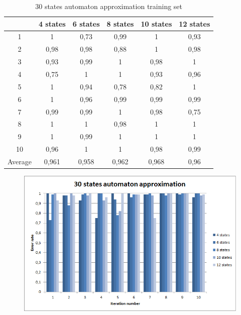 \documentclass[runningheads,a4paper]{llncs}
\begin{document}
\begin{table}[]
\centering
\caption{30 states automaton approximation training set}
\label{my-label}
\begin{tabular}{@{}cccccc@{}}
\toprule
        & 4 states & 6 states & 8 states & 10 states & 12 states    \\ \midrule
1       & 1        & 0,73     & 0,99     & 1         & 0,93 \\
2       & 0,98     & 0,98     & 0,88     & 1         & 0,98 \\
3       & 0,93     & 0,99     & 1        & 0,98      & 1 \\
4       & 0,75     & 1        & 1        & 0,93      & 0,96   \\
5       & 1        & 0,94     & 0,78     & 0,82      & 1   \\
6       & 1        & 0,96     & 0,99     & 0,99      & 0,99    \\
7       & 0,99     & 0,99     & 1        & 0,98      & 0,75    \\
8       & 1        & 1        & 0,98     & 1         & 1    \\
9       & 1        & 0,99     & 1        & 1         & 1 \\
10      & 0,96     & 1        & 1        & 0,98      & 0,99  \\
Average & 0,961    & 0,958    & 0,962    & 0,968     & 0,96  \\ \bottomrule
\end{tabular}
\end{table}

\begin{figure}
\centering
\includegraphics[scale=1]{8.png}
\end{figure}
\end{document}
